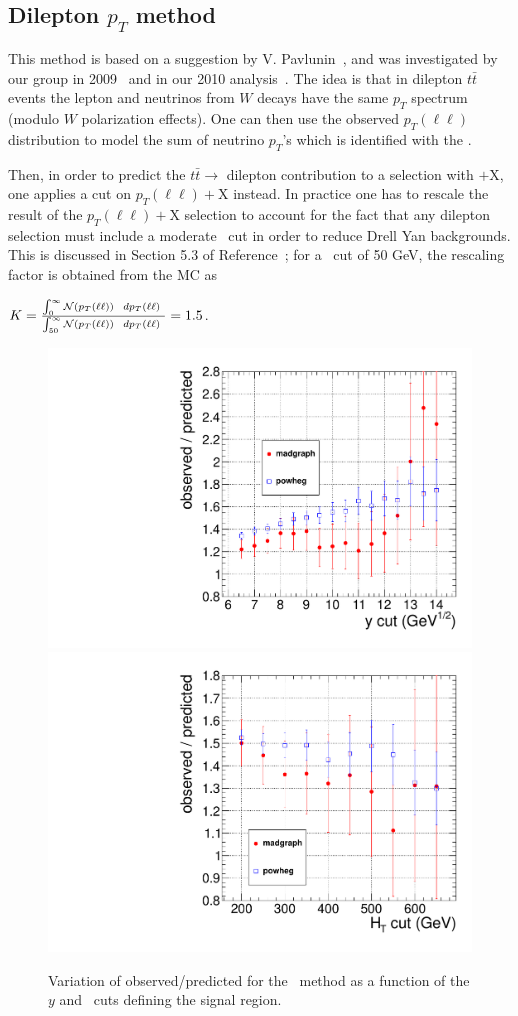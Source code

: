 \clearpage

\subsection{Dilepton $p_T$ method}
\label{sec:victory}
This method is based on a suggestion by V. Pavlunin~\cite{ref:victory},
and was investigated by our group in 2009~\cite{ref:ourvictory} and
in our 2010 analysis~\cite{ref:ospaper}.
The idea is that in dilepton $t\bar{t}$ events the lepton and neutrinos
from $W$ decays have the same $p_T$ spectrum (modulo $W$ polarization 
effects).  One can then use the observed 
$p_T(\ell\ell)$ distribution to model the sum of neutrino $p_T$'s which 
is identified with the \met.

Then, in order to predict the $t\bar{t} \to$ dilepton contribution to a 
selection with \met$+$X, one applies a cut on $p_T(\ell\ell)+$X instead.
In practice one has to rescale the result of the $p_T(\ell\ell)+$X selection
to account for the fact that any dilepton selection must include a 
moderate \met\ cut in order to reduce Drell Yan backgrounds.  This 
is discussed in Section 5.3 of Reference~\cite{ref:ourvictory}; for a \met\
cut of 50 GeV, the rescaling factor is obtained from the MC as

\begin{center}
$ K = \frac{\int_0^{\infty} {\cal N}(p_T(\ell\ell))~~dp_T(\ell\ell)~}{\int_{50}^{\infty} {\cal N}(p_T(\ell\ell))~~dp_T(\ell\ell)~} = 1.5$.
\end{center}

\begin{figure}[hbt]
\begin{center}
\includegraphics[width=0.48\linewidth]{plots/victory_yvary.pdf}
\includegraphics[width=0.48\linewidth]{plots/victory_htvary.pdf}
\caption{\label{fig:victory}\protect Variation of observed/predicted
for the \ptll\ method as a function of the $y$ and \Ht\ cuts defining
the signal region.}
\end{center}
\end{figure}

